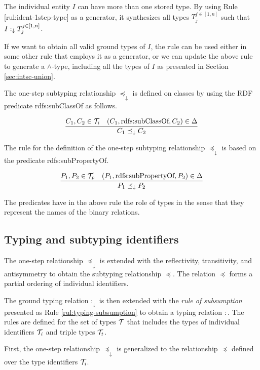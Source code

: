 \documentclass[runningheads]{llncs}
\newcommand{\darr}{\downarrow}
\newcommand{\T}{{\cal T}}
\begin{document}
The individual entity $I$ can have more than one stored type. By
using Rule \ref{rul:ident-1step-type} as a generator, it synthesizes
all types $T_j^{j\in[1,n]}$ such that $I:_\darr\/T_j^{j\in[1,n]}$.

If we want to obtain all valid ground types of $I$, the rule can be
used either in some other rule that employs it as a generator, or we
can update the above rule to generate a $\land$-type, including all
the types of $I$ as presented in Section \ref{sec:intsc-union}.

The one-step subtyping relationship $\preceq_\darr$ is defined on
classes by using the RDF predicate rdfs:sub\-ClassOf as follows.

\begin{equation}
\label{rul:ident-1step-subtype}
\dfrac{C_1,C_2\in\T_i \quad (C_1,\text{rdfs:subClassOf},C_2)\in\D}
{C_1 \preceq_\darr\/C_2}
\end{equation}

The rule for the definition of the one-step subtyping relationship
$\preceq_\darr$ is based on the predicate rdfs:subPropertyOf.

\begin{equation}
\dfrac{P_1,P_2\in\T_p \quad (P_1,\text{rdfs:subPropertyOf},P_2)\in\D}
      {P_1\preceq_\darr\/P_2}
\end{equation}

The predicates have in the above rule the role of types in the sense
that they represent the names of the binary relations. 



\subsection{Typing and subtyping identifiers\label{sec:idents-typing}}

The one-step relationship $\preceq_\darr$ is extended with the
reflectivity, transitivity, and antisymmetry to obtain the subtyping
relationship $\preceq$. The relation $\preceq$ forms a partial
ordering of individual identifiers.

The ground typing relation $:_\darr$ is then extended with the
\emph{rule of subsumption} presented as Rule
\ref{rul:typing-subsumption} to obtain a typing relation $:$. The
rules are defined for the set of types $\T$ that includes the types of
individual identifiers $\T_i$ and triple types $\T_t$.

First, the one-step relationship $\preceq_\darr$ is generalized to the
relationship $\preceq$ defined over the type identifiers
$\T_i$. 
\end{document}
